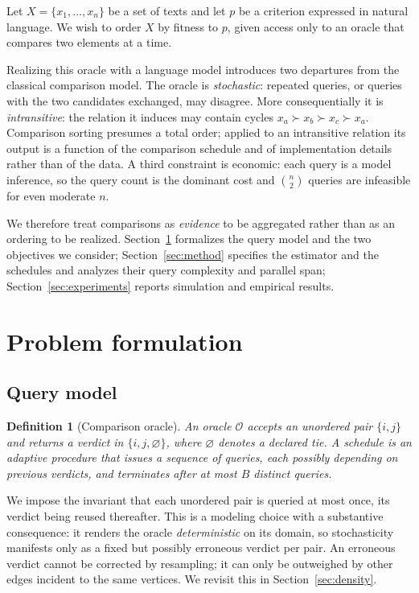 \documentclass[11pt,a4paper]{article}
\newtheorem{definition}{Definition}
\begin{document}
Let $X = \{x_1,\dots,x_n\}$ be a set of texts and let $p$ be a criterion
expressed in natural language. We wish to order $X$ by fitness to $p$, given
access only to an oracle that compares two elements at a time.

Realizing this oracle with a language model introduces two departures from the
classical comparison model. The oracle is \emph{stochastic}: repeated queries, or
queries with the two candidates exchanged, may disagree. More consequentially it
is \emph{intransitive}: the relation it induces may contain cycles
$x_a \succ x_b \succ x_c \succ x_a$. Comparison sorting presumes a total order;
applied to an intransitive relation its output is a function of the comparison
schedule and of implementation details rather than of the data. A third
constraint is economic: each query is a model inference, so the query count is
the dominant cost and $\binom{n}{2}$ queries are infeasible for even moderate
$n$.

We therefore treat comparisons as \emph{evidence} to be aggregated rather than
as an ordering to be realized. Section~\ref{sec:formulation} formalizes the query
model and the two objectives we consider; Section~\ref{sec:method} specifies the
estimator and the schedules and analyzes their query complexity and parallel
span; Section~\ref{sec:experiments} reports simulation and empirical results.

\section{Problem formulation}
\label{sec:formulation}

\subsection{Query model}

\begin{definition}[Comparison oracle]
An oracle $\mathcal{O}$ accepts an unordered pair $\{i,j\}$ and returns a verdict
in $\{i, j, \varnothing\}$, where $\varnothing$ denotes a declared tie. A
\emph{schedule} is an adaptive procedure that issues a sequence of queries, each
possibly depending on previous verdicts, and terminates after at most $B$
distinct queries.
\end{definition}

We impose the invariant that each unordered pair is queried at most once, its
verdict being reused thereafter. This is a modeling choice with a substantive
consequence: it renders the oracle \emph{deterministic} on its domain, so
stochasticity manifests only as a fixed but possibly erroneous verdict per pair.
An erroneous verdict cannot be corrected by resampling; it can only be
outweighed by other edges incident to the same vertices. We revisit this in
Section~\ref{sec:density}.
\end{document}
